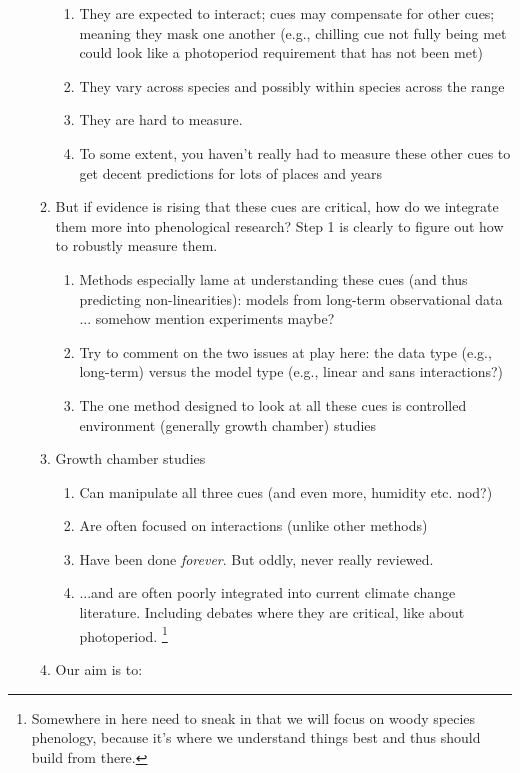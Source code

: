 \documentclass[11pt,letterpaper]{article}
\begin{document}
\begin{enumerate}
\begin{enumerate}
\begin{enumerate}
\item They are expected to interact; cues may compensate for other cues; meaning they mask one another (e.g., chilling cue not fully being met could look like a photoperiod requirement that has not been met)
\item They vary across species and possibly within species across the range
\item They are hard to measure.
\item To some extent, you haven't really had to measure these other cues to get decent predictions for lots of places and years
\end{enumerate}
\item But if evidence is rising that these cues are critical, how do we integrate them more into phenological research? Step 1 is clearly to figure out how to robustly measure them. 
\begin{enumerate}
\item Methods especially lame at understanding these cues (and thus predicting non-linearities): models from long-term observational data ... somehow mention experiments maybe?
\item Try to comment on the two issues at play here: the data type (e.g., long-term) versus the model type (e.g., linear and sans interactions?)
\item The one method designed to look at all these cues is controlled environment (generally growth chamber) studies
\end{enumerate}
\item Growth chamber studies
\begin{enumerate}
\item Can manipulate all three cues (and even more, humidity etc. nod?)
\item Are often focused on interactions (unlike other methods)
\item Have been done \emph{forever}. But oddly, never really reviewed.
\item  ...and are often poorly integrated into current climate change literature. Including debates where they are critical, like about photoperiod. \footnote{Somewhere in here need to sneak in that we will focus on woody species phenology, because it's where we understand things best and thus should build from there.}
\end{enumerate}
\item Our aim is to:
\begin{enumerate}

\end{enumerate}
\end{enumerate}
\end{enumerate}
\end{document}

